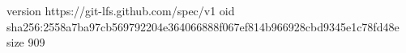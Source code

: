 version https://git-lfs.github.com/spec/v1
oid sha256:2558a7ba97cb569792204e364066888f067ef814b966928cbd9345e1c78fd48e
size 909
